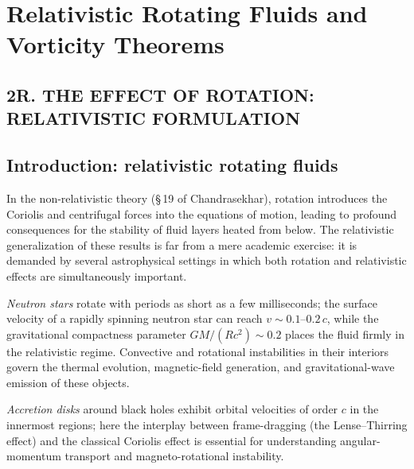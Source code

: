 
\chapter{Relativistic Rotating Fluids and Vorticity Theorems}
\label{ch:rel-3-rotation}

\section*{2R. THE EFFECT OF ROTATION: RELATIVISTIC FORMULATION}

\section{Introduction: relativistic rotating fluids}\label{sec:rel-3-19}

In the non-relativistic theory (\S\,19 of Chandrasekhar), rotation introduces
the Coriolis and centrifugal forces into the equations of motion, leading to
profound consequences for the stability of fluid layers heated from below.
The relativistic generalization of these results is far from a mere academic
exercise: it is demanded by several astrophysical settings in which both
rotation and relativistic effects are simultaneously important.

\emph{Neutron stars} rotate with periods as short as a few milliseconds;
the surface velocity of a rapidly spinning neutron star can reach
$v \sim 0.1\text{--}0.2\,c$, while the gravitational compactness parameter
$GM/(Rc^{2}) \sim 0.2$ places the fluid firmly in the relativistic regime.
Convective and rotational instabilities in their interiors govern the thermal
evolution, magnetic-field generation, and gravitational-wave emission of
these objects.

\emph{Accretion disks} around black holes exhibit orbital velocities of order
$c$ in the innermost regions; here the interplay between frame-dragging
(the Lense--Thirring effect) and the classical Coriolis effect is essential
for understanding angular-momentum transport and magneto-rotational
instability.

